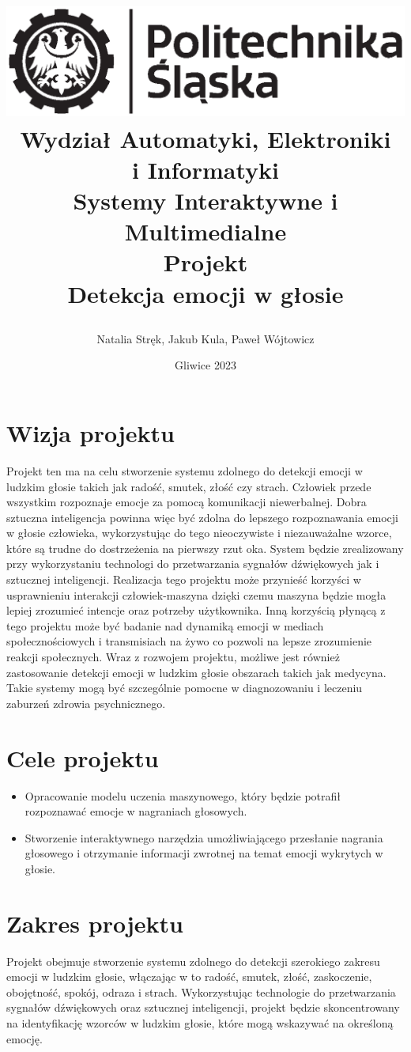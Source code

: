 \documentclass[12pt,titlepage]{article}
\title{
\includegraphics[scale=0.75]{img/politechnika_sl_logo_bw_poziom_pl.eps}\\
\textbf{Wydział Automatyki, Elektroniki\\
i Informatyki}\\
\vspace*{1cm}
Systemy Interaktywne i Multimedialne \\ Projekt \\ Detekcja emocji w głosie

\vspace*{5cm}
}
\author{
Natalia Stręk,
Jakub Kula,
Paweł Wójtowicz
}
\date{Gliwice 2023}
\begin{document}
\maketitle

\tableofcontents

\newpage


\section{Wizja projektu}
Projekt ten ma na celu stworzenie systemu zdolnego do detekcji emocji w ludzkim głosie takich jak radość, smutek, złość czy strach. Człowiek przede wszystkim rozpoznaje emocje za pomocą komunikacji niewerbalnej. Dobra sztuczna inteligencja powinna więc być zdolna do lepszego rozpoznawania emocji w głosie człowieka, wykorzystując do tego nieoczywiste i niezauważalne wzorce, które są trudne do dostrzeżenia na pierwszy rzut oka. System będzie zrealizowany przy wykorzystaniu technologi do przetwarzania sygnałów dźwiękowych jak i sztucznej inteligencji. Realizacja tego projektu może przynieść korzyści w usprawnieniu interakcji człowiek-maszyna dzięki czemu maszyna będzie mogła lepiej zrozumieć intencje oraz potrzeby użytkownika. Inną korzyścią płynącą z tego projektu może być badanie nad dynamiką emocji w mediach społecznościowych i transmisiach na żywo co pozwoli na lepsze zrozumienie reakcji społecznych. Wraz z rozwojem projektu, możliwe jest również zastosowanie detekcji emocji w ludzkim głosie obszarach takich jak medycyna. Takie systemy mogą być szczególnie pomocne w diagnozowaniu i leczeniu zaburzeń zdrowia psychnicznego.

\section{Cele projektu}
\begin{itemize}
    \item Opracowanie modelu uczenia maszynowego, który będzie potrafił rozpoznawać emocje w nagraniach głosowych.
    \item Stworzenie interaktywnego narzędzia umożliwiającego przesłanie nagrania głosowego i otrzymanie informacji zwrotnej na temat emocji wykrytych w głosie.
\end{itemize}

\section{Zakres projektu}
Projekt obejmuje stworzenie systemu zdolnego do detekcji szerokiego zakresu emocji w ludzkim głosie, włączając w to radość, smutek, złość, zaskoczenie, obojętność, spokój, odraza i strach. Wykorzystując technologie do przetwarzania sygnałów dźwiękowych oraz sztucznej inteligencji, projekt będzie skoncentrowany na identyfikację wzorców w ludzkim głosie, które mogą wskazywać na określoną emocję.
\end{document}
